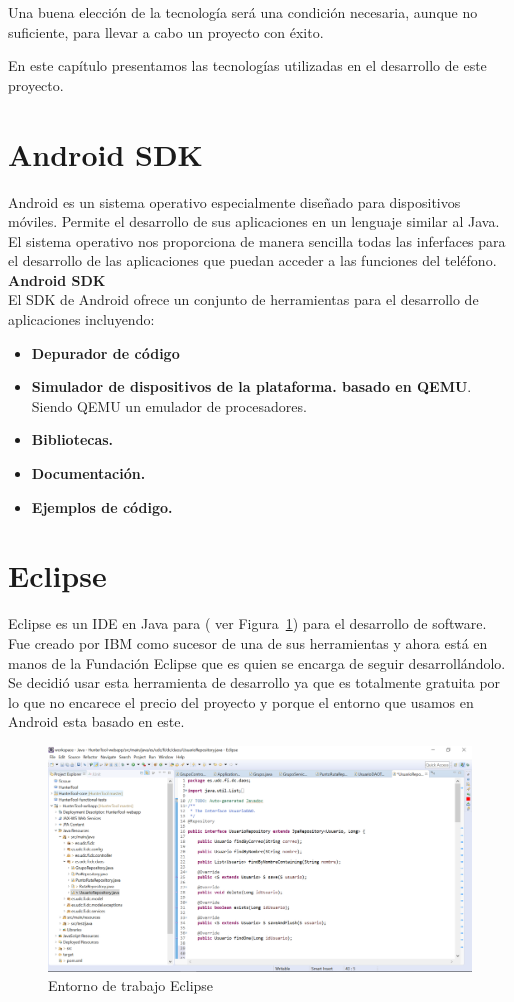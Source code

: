 
Una buena elección de la tecnología será una condición necesaria, aunque no suficiente, para llevar a cabo un proyecto con éxito.

En este capítulo presentamos las tecnologías utilizadas en el desarrollo de este proyecto. 
\section{Android SDK}
Android  \cite{2}  \cite{3} es un sistema operativo especialmente diseñado para dispositivos móviles. Permite el desarrollo de sus aplicaciones en un lenguaje similar al Java. El sistema operativo nos proporciona de manera sencilla todas las inferfaces para el desarrollo de las aplicaciones que puedan acceder a las funciones del teléfono.\\

\textbf{Android SDK}\\

El SDK de Android ofrece un conjunto de herramientas para el desarrollo de aplicaciones incluyendo:
\begin{itemize}
\item \textbf{Depurador de código}
\item \textbf{Simulador de dispositivos de la plataforma. basado en QEMU}. Siendo QEMU  un emulador de procesadores. 
\item\textbf{ Bibliotecas.}
\item \textbf{Documentación.}
\item \textbf{Ejemplos de código.}

\end{itemize}


\section{Eclipse }


Eclipse es un IDE en Java para
( ver Figura~\ref{fig:eclipse}) para el desarrollo de software. Fue creado por IBM como sucesor de una de sus herramientas y ahora está en manos de la Fundación Eclipse que es quien se encarga de seguir desarrollándolo.
Se decidió usar esta herramienta de desarrollo ya que es totalmente gratuita por lo que no encarece el precio del proyecto y porque el entorno que usamos en Android esta basado en este.  
\begin{figure}[H]
		\centering
		\includegraphics[width=\textwidth] {eclipse.png}
		\caption{Entorno de trabajo Eclipse }
		\label{fig:eclipse}
	\end{figure}
	
